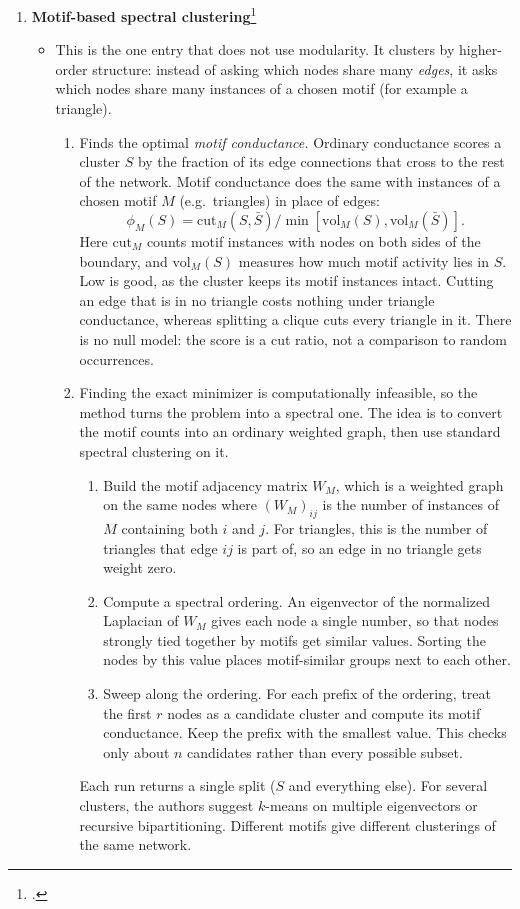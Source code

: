 \documentclass{article}
\newcommand{\nc}[1]{(#1)}
\begin{document}
\begin{enumerate}
\begin{itemize}
\begin{enumerate}
        \end{enumerate}
    \end{itemize}
    \item \textbf{Motif-based spectral clustering}\footcite{benson2016higher}
    \begin{itemize}
        \item This is the one entry that does not use modularity. It clusters by higher-order structure: instead of asking which nodes share many \textit{edges}, it asks which nodes share many instances of a chosen motif (for example a triangle).
        \begin{enumerate}
            \item Finds the optimal \textit{motif conductance.} Ordinary conductance scores a cluster $S$ by the fraction of its edge connections that cross to the rest of the network. Motif conductance does the same with instances of a chosen motif $M$ (e.g.\ triangles) in place of edges: $$\phi_M(S) = \text{cut}_M(S,\bar{S}) / \min[\text{vol}_M(S),\text{vol}_M(\bar{S})].$$ Here $\text{cut}_M$ counts motif instances with nodes on both sides of the boundary, and $\text{vol}_M(S)$ measures how much motif activity lies in $S$. Low is good, as the cluster keeps its motif instances intact. Cutting an edge that is in no triangle costs nothing under triangle conductance, whereas splitting a clique cuts every triangle in it. There is no null model: the score is a cut ratio, not a comparison to random occurrences.
           \item Finding the exact minimizer is computationally infeasible, so the method turns the problem into a spectral one. The idea is to convert the motif counts into an ordinary weighted graph, then use standard spectral clustering on it.
\begin{enumerate}
    \item[\nc 1] Build the motif adjacency matrix $W_M$, which is a weighted graph on the same nodes where $(W_M)_{ij}$ is the number of instances of $M$ containing both $i$ and $j$. For triangles, this is the number of triangles that edge $ij$ is part of, so an edge in no triangle gets weight zero.
    \item[\nc 2] Compute a spectral ordering. An eigenvector of the normalized Laplacian of $W_M$ gives each node a single number, so that nodes strongly tied together by motifs get similar values. Sorting the nodes by this value places motif-similar groups next to each other.
    \item[\nc 3] Sweep along the ordering. For each prefix of the ordering, treat the first $r$ nodes as a candidate cluster and compute its motif conductance. Keep the prefix with the smallest value. This checks only about $n$ candidates rather than every possible subset.
\end{enumerate}
Each run returns a single split ($S$ and everything else). For several clusters, the authors suggest $k$-means on multiple eigenvectors or recursive bipartitioning. Different motifs give different clusterings of the same network.


\end{enumerate}
\end{itemize}
\end{enumerate}
\end{document}
